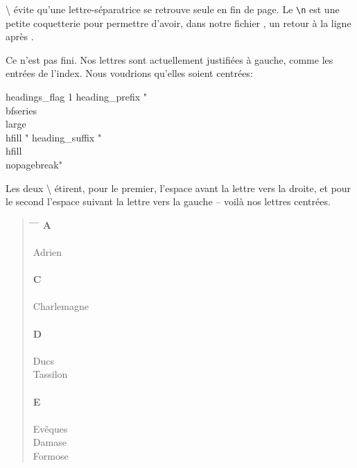 \textbackslash{} évite qu'une lettre-séparatrice se retrouve seule en fin de page. Le \verb|\n| est une petite coquetterie pour permettre d'avoir, dans notre fichier , un retour à la ligne après .



Ce n'est pas fini. Nos lettres sont actuellement justifiées à gauche, comme les entrées de l'index. Nous voudrions qu'elles soient centrées: 

\begin{latexcode}
headings_flag 1
heading_prefix " {\\bfseries\\large\\hfill " 
heading_suffix " \\hfill}\\nopagebreak\n " 
\end{latexcode}

Les deux \textbackslash{} étirent, pour le premier, l'espace avant la lettre vers la droite, et pour le second l'espace suivant la lettre vers la gauche -- voilà nos lettres centrées.

\begin{quotation}
\begin{tabbing}
\hspace{0,5cm}  \= \hspace{1cm} \= \hspace{1,5cm} \= \kill
\>\> \large{\textbf{A}}\\
\\
Adrien\>\> \\
\\
\>\> \large{\textbf{C}}\\
\\
Charlemagne \>\> \\
\\
\>\> \large{\textbf{D}}\\
\\
Ducs \\
\> Tassilon\>\\
\\
\>\> \large{\textbf{E}}\\
\\
Evêques \\
\> Damase \>\\
\> Formose\>\\
\end{tabbing}
\end{quotation}


